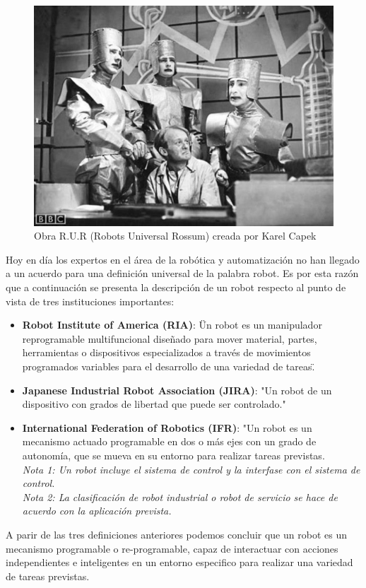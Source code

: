     \begin{figure}[htb]
        \centering
        \includegraphics[width=0.4\linewidth]{Main/Chapter2/Images2/Obra-robots.jpg}
        \caption{Obra R.U.R (Robots Universal Rossum) creada por Karel Capek}
        \label{f:Cap2_general_2}
    \end{figure}
    
    Hoy en día los expertos en el área de la robótica y automatización no han llegado a un acuerdo para una definición universal de la palabra robot. Es por esta razón que a continuación se presenta la descripción de un robot respecto al punto de vista de tres instituciones importantes:
    
    \begin{itemize}
    
        \item \textbf{Robot Institute of America (RIA)}: \"Un robot es un manipulador reprogramable multifuncional diseñado para mover material, partes, herramientas o dispositivos especializados a través de movimientos programados variables para el desarrollo de una variedad de tareas.\"
        
        \item \textbf{Japanese Industrial Robot Association (JIRA)}: "Un robot de un dispositivo con grados de libertad que puede ser controlado."
        
        \item \textbf{International Federation of Robotics (IFR)}: "Un robot es un mecanismo actuado programable en dos o más ejes con un grado de autonomía, que se mueva en su entorno para realizar tareas previstas.\\
        \textit{Nota 1: Un robot incluye el sistema de control y la interfase con el sistema de control.}\\
        \textit{Nota 2: La clasificación de robot industrial o robot de servicio se hace de acuerdo con la aplicación prevista.}
        
    \end{itemize}
    
    A parir de las tres definiciones anteriores podemos concluir que un robot es un mecanismo programable o re-programable, capaz de interactuar con acciones independientes e inteligentes en un entorno especifico para realizar una variedad de tareas previstas.
    
